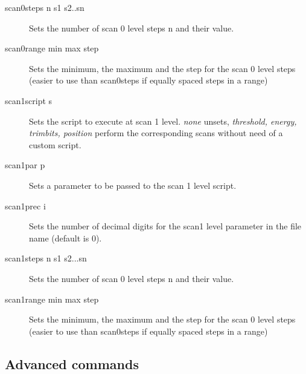 \documentclass{article}
\begin{document}
\begin{description}
 \item[scan0steps n s1 s2..sn]  Sets the number of scan 0 level steps n and their value.      
 \item[scan0range min max step] Sets the minimum, the maximum and the step for the scan 0 level steps (easier to use than scan0steps if equally spaced steps in a range)      
 \item[scan1script s]      Sets the script to execute at scan 1 level.   \textit{none} unsets,  \textit{threshold, energy, trimbits, position} perform the corresponding scans without need of a custom script.    
 \item[scan1par p]     Sets a parameter to be passed to the scan 1 level script.          
 \item[scan1prec i]        Sets the number of decimal digits for the scan1 level parameter in the file name (default is 0).
 \item[scan1steps n s1 s2...sn]     Sets the number of scan 0 level steps n and their value.       
 \item[scan1range min max step]       Sets the minimum, the maximum and the step for the scan 0 level steps (easier to use than scan0steps if equally spaced steps in a range)      
\end{description}

\begin{comment}
\subsection{Debug}

\begin{description}
\item[moduleversion]   
\item[detectornumber]  
\item[modulenumber]    
\item[detectorversion] 
\item[softwareversion] 
\item[thisversion]  
\item[detectorsvnversion]       
\item[digitest]        
\item[bustest] 
\item[digibittest]     
\item[acqtest]
\end{description}
\end{comment}


\subsection{Advanced commands}
\end{document}
